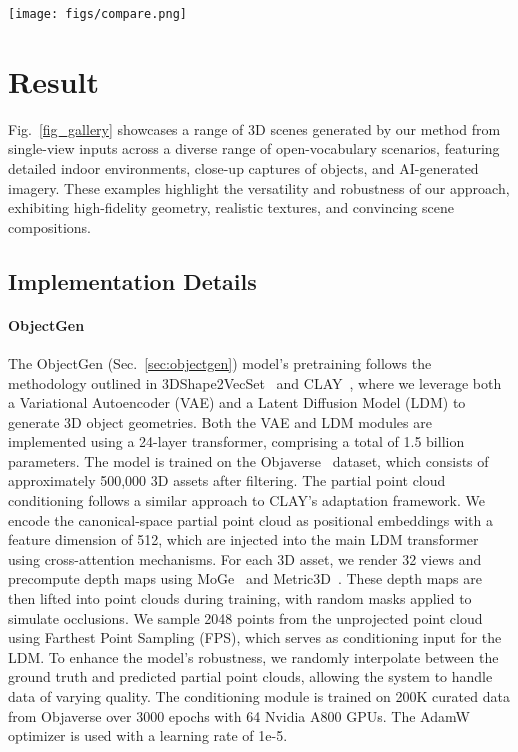 

\begin{figure*} []
  \centering
  \texttt{[image: figs/compare.png]}
  \label{fig_comparison1}
\end{figure*}


\section{Result}
\label{sec:experiments}


Fig.~\ref{fig_gallery} showcases a range of 3D scenes generated by our method from single-view inputs across a diverse range of open-vocabulary scenarios, featuring detailed indoor environments, close-up captures of objects, and AI-generated imagery. These examples highlight the versatility and robustness of our approach, exhibiting high-fidelity geometry, realistic textures, and convincing scene compositions.

\subsection{Implementation Details}
\paragraph{ObjectGen}
The ObjectGen (Sec.~\ref{sec:objectgen}) model's pretraining follows the methodology outlined in 3DShape2VecSet~\cite{zhang20233dshape2vecset} and CLAY~\cite{zhang2024clay}, where we leverage both a Variational Autoencoder (VAE) and a Latent Diffusion Model (LDM) to generate 3D object geometries. Both the VAE and LDM modules are implemented using a 24-layer transformer, comprising a total of 1.5 billion parameters. The model is trained on the Objaverse~\cite{deitke2023objaverse} dataset, which consists of approximately 500,000 3D assets after filtering. 
% 
The partial point cloud conditioning follows a similar approach to CLAY's adaptation framework. We encode the canonical-space partial point cloud as positional embeddings with a feature dimension of 512, which are injected into the main LDM transformer using cross-attention mechanisms. For each 3D asset, we render 32 views and precompute depth maps using MoGe~\cite{wang2024moge} and Metric3D~\cite{yin2023metric3d}. These depth maps are then lifted into point clouds during training, with random masks applied to simulate occlusions. We sample 2048 points from the unprojected point cloud using Farthest Point Sampling (FPS), which serves as conditioning input for the LDM. To enhance the model's robustness, we randomly interpolate between the ground truth and predicted partial point clouds, allowing the system to handle data of varying quality. The conditioning module is trained on 200K curated data from Objaverse over 3000 epochs with 64 Nvidia A800 GPUs. The AdamW optimizer is used with a learning rate of 1e-5.

